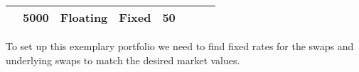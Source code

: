 \begin{longtable}[]{@{}llllllll@{}}
\begin{minipage}[t]{0.07\columnwidth}
\end{minipage} & \begin{minipage}[t]{0.11\columnwidth}\raggedright
5000\strut
\end{minipage} & \begin{minipage}[t]{0.11\columnwidth}\raggedright
Floating\strut
\end{minipage} & \begin{minipage}[t]{0.13\columnwidth}\raggedright
Fixed\strut
\end{minipage} & \begin{minipage}[t]{0.13\columnwidth}\raggedright
50\strut
\end{minipage}\tabularnewline
\bottomrule
\end{longtable}

To set up this exemplary portfolio we need to find fixed rates for the
swaps and underlying swaps to match the desired market values.

